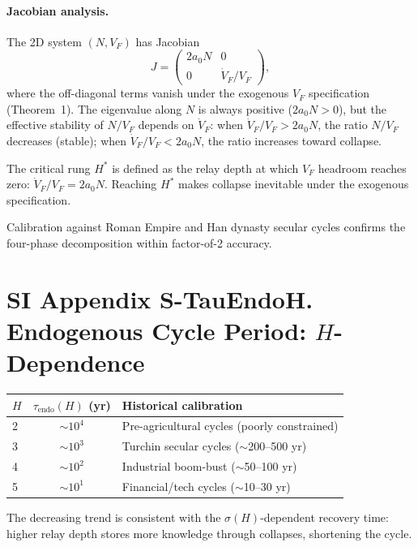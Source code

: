 \documentclass[11pt]{article}
\begin{document}
\paragraph{Jacobian analysis.}
The 2D system $(N, V_F)$ has Jacobian
\[
J = \begin{pmatrix} 2a_0 N & 0 \\ 0 & \dot{V}_F / V_F \end{pmatrix},
\]
where the off-diagonal terms vanish under the exogenous $V_F$ specification (Theorem~1).
The eigenvalue along $N$ is always positive ($2a_0 N > 0$), but the effective stability of $N/V_F$ depends on $\dot{V}_F$: when $\dot{V}_F/V_F > 2a_0 N$, the ratio $N/V_F$ decreases (stable); when $\dot{V}_F/V_F < 2a_0 N$, the ratio increases toward collapse.

The critical rung $H^*$ is defined as the relay depth at which $V_F$ headroom reaches zero: $\dot{V}_F/V_F = 2a_0 N$.
Reaching $H^*$ makes collapse inevitable under the exogenous specification.

Calibration against Roman Empire and Han dynasty secular cycles confirms the four-phase decomposition within factor-of-2 accuracy.


\section*{SI Appendix S-TauEndoH. Endogenous Cycle Period: $H$-Dependence}

\begin{center}
\begin{tabular}{lcl}
\toprule
$H$ & $\tau_{\mathrm{endo}}(H)$ (yr) & Historical calibration \\
\midrule
2 & $\sim 10^4$ & Pre-agricultural cycles (poorly constrained) \\
3 & $\sim 10^3$ & Turchin secular cycles ($\sim$200--500 yr) \\
4 & $\sim 10^2$ & Industrial boom-bust ($\sim$50--100 yr) \\
5 & $\sim 10^1$ & Financial/tech cycles ($\sim$10--30 yr) \\
\bottomrule
\end{tabular}
\end{center}

The decreasing trend is consistent with the $\sigma(H)$-dependent recovery time: higher relay depth stores more knowledge through collapses, shortening the cycle.
\end{document}
